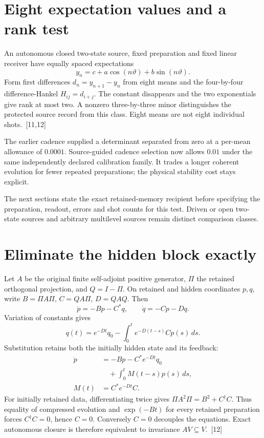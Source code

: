 \documentclass[10pt,twocolumn,letterpaper]{article}
\begin{document}
\section{Eight expectation values and a rank test}
An autonomous closed two-state source, fixed preparation and fixed linear receiver have equally spaced expectations
\[
y_n=c+a\cos(n\vartheta)+b\sin(n\vartheta).
\]
Form first differences $d_n=y_{n+1}-y_n$ from eight means and the four-by-four difference-Hankel $H_{ij}=d_{i+j}$. The constant disappears and the two exponentials give rank at most two. A nonzero three-by-three minor distinguishes the protected source record from this class. Eight means are not eight individual shots.~[11,12]

The earlier cadence supplied a determinant separated from zero at a per-mean allowance of $0.0001$. Source-guided cadence selection now allows $0.01$ under the same independently declared calibration family. It trades a longer coherent evolution for fewer repeated preparations; the physical stability cost stays explicit.

The next sections state the exact retained-memory recipient before specifying the preparation, readout, errors and shot counts for this test. Driven or open two-state sources and arbitrary multilevel sources remain distinct comparison classes.

\section{Eliminate the hidden block exactly}
Let $A$ be the original finite self-adjoint positive generator, $\Pi$ the retained orthogonal projection, and $Q=I-\Pi$. On retained and hidden coordinates $p,q$, write $B=\Pi A\Pi$, $C=QA\Pi$, $D=QAQ$. Then
\[
\dot p=-Bp-C^*q,\qquad\dot q=-Cp-Dq.
\]
Variation of constants gives
\[
q(t)=e^{-Dt}q_0-\int_0^t e^{-D(t-s)}Cp(s)\,ds.
\]
Substitution retains both the initially hidden state and its feedback:
\[
\begin{aligned}
\dot p&=-Bp-C^*e^{-Dt}q_0\\
&\quad+\int_0^t M(t-s)p(s)\,ds,\\
M(t)&=C^*e^{-Dt}C.
\end{aligned}
\]
For initially retained data, differentiating twice gives $\Pi A^2\Pi=B^2+C^\dagger C$. Thus equality of compressed evolution and $\exp(-Bt)$ for every retained preparation forces $C^\dagger C=0$, hence $C=0$. Conversely $C=0$ decouples the equations. Exact autonomous closure is therefore equivalent to invariance $AV\subseteq V$.~[12]
\end{document}
